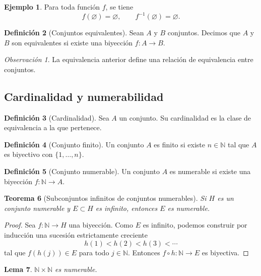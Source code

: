 \documentclass[12pt]{article}
\theoremstyle{definition}
\newtheorem{definition}{Definición}[section]
\newtheorem{example}[definition]{Ejemplo}
\theoremstyle{plain}
\newtheorem{theorem}[definition]{Teorema}
\newtheorem{lemma}[definition]{Lema}
\theoremstyle{remark}
\newtheorem*{remark}{Observación}
\begin{document}
\begin{example}
Para toda función $f$, se tiene
\[
f(\varnothing)=\varnothing,
\qquad
f^{-1}(\varnothing)=\varnothing.
\]
\end{example}

\begin{definition}[Conjuntos equivalentes]
Sean $A$ y $B$ conjuntos.
Decimos que $A$ y $B$ son equivalentes si existe una biyección $f\colon A\to B$.
\end{definition}

\begin{remark}
La equivalencia anterior define una relación de equivalencia entre conjuntos.
\end{remark}

\subsection*{Cardinalidad y numerabilidad}

\begin{definition}[Cardinalidad]
Sea $A$ un conjunto. Su cardinalidad es la clase de equivalencia a la que pertenece.
\end{definition}

\begin{definition}[Conjunto finito]
Un conjunto $A$ es finito si existe $n\in\mathbb N$ tal que $A$ es biyectivo con $\{1,\dots,n\}$.
\end{definition}

\begin{definition}[Conjunto numerable]
Un conjunto $A$ es numerable si existe una biyección $f\colon\mathbb N\to A$.
\end{definition}

\begin{theorem}[Subconjuntos infinitos de conjuntos numerables]
Si $H$ es un conjunto numerable y $E\subset H$ es infinito, entonces $E$ es numerable.
\end{theorem}

\begin{proof}
Sea $f\colon\mathbb N\to H$ una biyección.
Como $E$ es infinito, podemos construir por inducción una sucesión estrictamente creciente
\[
h(1)<h(2)<h(3)<\cdots
\]
tal que $f(h(j))\in E$ para todo $j\in\mathbb N$.
Entonces $f\circ h\colon\mathbb N\to E$ es biyectiva.
\end{proof}

\begin{lemma}
$\mathbb N\times\mathbb N$ es numerable.
\end{lemma}
\end{document}
